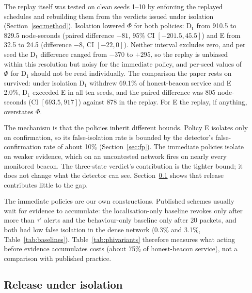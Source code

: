 \documentclass[pdflatex,sn-mathphys-num]{sn-jnl}%
\theoremstyle{thmstyleone}%
\theoremstyle{thmstyletwo}%
\theoremstyle{thmstylethree}%
\begin{document}
The replay itself was tested on clean seeds 1--10 by enforcing the replayed
schedules and rebuilding them from the verdicts issued under isolation
(Section~\ref{sec:method}). Isolation lowered $\Phi$ for both policies: D$_1$
from 910.5 to 829.5 node-seconds (paired difference $-81$, 95\% CI
$[-201.5, 45.5]$) and E from 32.5 to 24.5 (difference $-8$, CI $[-22, 0]$).
Neither interval excludes zero, and per seed the D$_1$ difference ranged from
$-370$ to $+295$, so the replay is unbiased within this resolution but noisy
for the immediate policy, and per-seed values of $\Phi$ for D$_1$ should not
be read individually. The comparison the paper rests on survived: under
isolation D$_1$ withdrew 69.1\% of honest-beacon service and E 2.0\%, D$_1$
exceeded E in all ten seeds, and the paired difference was 805 node-seconds
(CI $[693.5, 917]$) against 878 in the replay. For E the replay, if anything,
overstates $\Phi$.

The mechanism is that the policies inherit different bounds. Policy E isolates
only on confirmation, so its false-isolation rate is bounded by the detector's
false-confirmation rate of about 10\% (Section~\ref{sec:fp}). The immediate
policies isolate on weaker evidence, which on an uncontested network fires on
nearly every monitored beacon. The three-state verdict's contribution is the
tighter bound; it does not change what the detector can see.
Section~\ref{sec:release} shows that release contributes little to the gap.

The immediate policies are our own constructions. Published schemes usually
wait for evidence to accumulate: the localisation-only baseline revokes only
after more than $\tau'$ alerts and the behaviour-only baseline only after 20
packets, and both had low false isolation in the dense network (0.3\% and
3.1\%, Table~\ref{tab:baselines}). Table~\ref{tab:phivariants} therefore
measures what acting before evidence accumulates costs (about 75\% of
honest-beacon service), not a comparison with published practice.

\subsection{Release under isolation}
\label{sec:release}
\end{document}
